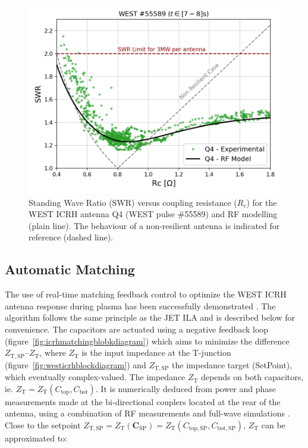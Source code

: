 \documentclass[12p]{iopart}
\newcommand{\ZT}{Z_{\mathrm{T}}}
\newcommand{\ZTSP}{Z_{\mathrm{T,SP}}}
\begin{document}
\begin{figure}
	\centering
	\includegraphics[width=0.95\linewidth]{figures/WEST_ICRH_55589_load_resilience_Q4}
	\caption{Standing Wave Ratio (SWR) versus coupling resistance ($R_c$) for the WEST ICRH antenna Q4 (WEST pulse \#55589) and RF modelling (plain line). The behaviour of a non-resilient antenna is indicated for reference (dashed line). }
	\label{fig:westicrh55589loadresilienceq4}
\end{figure}


\subsection{Automatic Matching}


The use of real-time matching feedback control to optimize the WEST ICRH antenna response during plasma has been successfully demonstrated \cite{helou2020}. The algorithm follows the same principle as the JET ILA \cite{durodie2015} and is described below for convenience. The capacitors are actuated using a negative feedback loop (figure~\ref{fig:icrhmatchingblobkdiagram}) which aims to minimize the difference $\ZTSP – \ZT$, where $\ZT$ is the input impedance at the T-junction (figure~\ref{fig:westicrhblockdiagram}) and $\ZTSP$ the impedance target (SetPoint), which eventually complex-valued. The impedance $\ZT$ depends on both capacitors, ie. $\ZT=\ZT(C_{\mathrm{top}}, C_{\mathrm{bot}})$. It is numerically deduced from power and phase measurements made at the bi-directional couplers located at the rear of the antenna, using a combination of RF measurements and full-wave simulations \cite{helou2020}. Close to the setpoint $\ZTSP=\ZT(\mathbf{C}_{\mathrm{SP}}) = \ZT(C_{\mathrm{top,SP}}, C_{\mathrm{bot,SP}})$, $\ZT$ can be approximated to:
\end{document}
